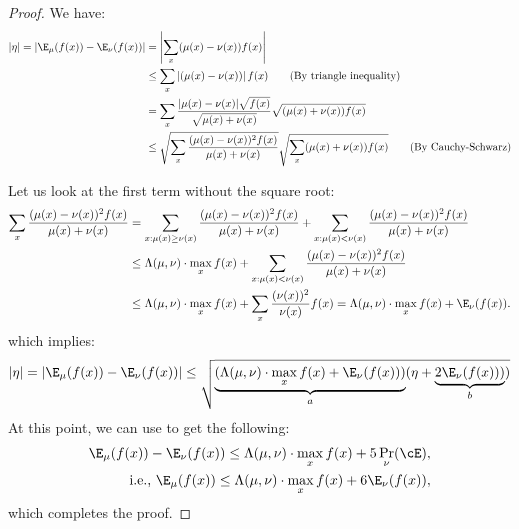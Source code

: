 \begin{proof}
We have:
\begin{align*}
    |\eta|=\left|\E_\mu(f(x)) - \E_\nu(f(x))\right| &= \left|\sum_x(\mu(x) - \nu(x))f(x)\right|\\
    &\leq \sum_x\left|(\mu(x) - \nu(x))\right|f(x)\tag{By triangle inequality}\\
    &= \sum_x\frac{|\mu(x) - \nu(x)|\sqrt{f(x)}}{\sqrt{\mu(x) + \nu(x)}} \sqrt{(\mu(x) + \nu(x)) f(x)}\\
    &\leq \sqrt{\sum_x\frac{(\mu(x) - \nu(x))^2f(x)}{\mu(x) + \nu(x)}} \sqrt{\sum_x(\mu(x) + \nu(x)) f(x)}\tag{By Cauchy-Schwarz}
\end{align*}

\noindent
Let us look at the first term without the square root:
\begin{align*}
    \sum_x\frac{(\mu(x) - \nu(x))^2f(x)}{\mu(x) + \nu(x)} &= \sum_{x: \mu(x) \geq \nu(x)}\frac{(\mu(x) - \nu(x))^2f(x)}{\mu(x) + \nu(x)} + \sum_{x: \mu(x) < \nu(x)}\frac{(\mu(x) - \nu(x))^2f(x)}{\mu(x) + \nu(x)}\\
    &\leq \Lambda(\mu,\nu)\cdot \max_x f(x) + \sum_{x: \mu(x) < \nu(x)}\frac{(\mu(x) - \nu(x))^2f(x)}{\mu(x) + \nu(x)}\\
    &\leq \Lambda(\mu,\nu)\cdot \max_x f(x) + \sum_{x}\frac{(\nu(x))^2}{\nu(x)}f(x) = \Lambda(\mu,\nu)\cdot \max_x f(x) + \E_\nu(f(x)).
\end{align*}
which implies:
\begin{align*}
    |\eta|=\left|\E_\mu(f(x)) - \E_\nu(f(x))\right| \leq \sqrt{\underbrace{(\Lambda(\mu,\nu)\cdot \max_x f(x) + \E_\nu(f(x)))}_{a} (\eta+ \underbrace{2\E_\nu(f(x)))}_b)}
\end{align*}
At this point, we can use  to get the following:
\begin{align*}
    \E_\mu(f(x)) - \E_\nu(f(x)) \leq \Lambda(\mu,\nu)\cdot \max_x f(x) + 5\Pr_\nu(\cE),\\
    \text{i.e., }\E_\mu(f(x))\leq \Lambda(\mu,\nu)\cdot \max_x f(x) + 6\E_\nu(f(x)),
\end{align*}
which completes the proof.
\end{proof}

\convex*

